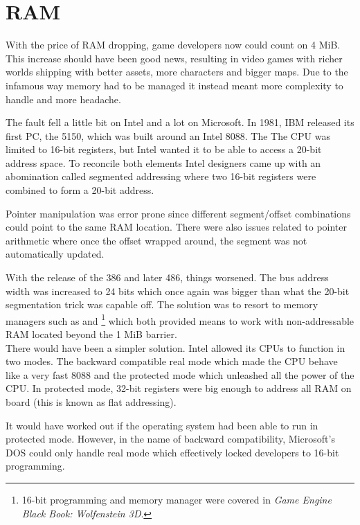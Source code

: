 \section{RAM}
With the price of RAM dropping, game developers now could count on 4 MiB. This increase should have been good news, resulting in video games with richer worlds shipping with better assets, more characters and bigger maps. Due to the infamous way memory had to be managed it instead meant more complexity to handle and more headache.\\
\par
The fault fell a little bit on Intel and a lot on Microsoft. In 1981, IBM released its first PC, the 5150,  which was built around an Intel 8088. The The CPU was limited to 16-bit registers, but Intel wanted it to be able to access a 20-bit address space. To reconcile both elements Intel designers came up with an abomination called segmented addressing where two 16-bit registers were combined to form a 20-bit address.\\
\par


\par
Pointer manipulation was error prone since different segment/offset combinations could point to the same RAM location. There were also issues related to pointer arithmetic where once the offset wrapped around, the segment was not automatically updated.\\
\par
With the release of the 386 and later 486, things worsened. The bus address width was increased to 24 bits which once again was bigger than what the 20-bit segmentation trick was capable off. The solution was to resort to memory managers such as  and \footnote{16-bit programming and memory manager were covered in \textit{Game Engine Black Book: Wolfenstein 3D}.} which both provided means to work with non-addressable RAM located beyond the 1 MiB barrier.\\

There would have been a simpler solution. Intel allowed its CPUs to function in two modes. The backward compatible real mode which made the CPU behave like a very fast 8088 and the protected mode which unleashed all the power of the CPU. In protected mode, 32-bit registers were big enough to address all RAM on board (this is known as flat addressing).\\
\par
It would have worked out if the operating system had been able to run in protected mode. However, in the name of backward compatibility, Microsoft's DOS could only handle real mode which effectively locked developers to 16-bit programming.\\ 
\par




